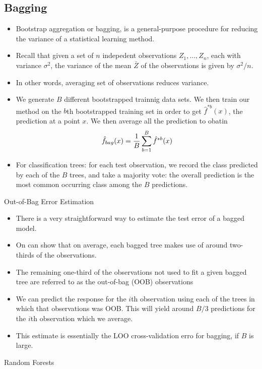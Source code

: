 \documentclass[11pt, a4paper]{article}
\begin{document}
\subsection{Bagging}
\begin{itemize}
  \item Bootstrap aggregation or bagging, is a general-purpose procedure for reducing the variance of a statistical learning method.
  \item Recall that given a set of $n$ indepedent observations $Z_1,\dots,Z_n$, each with variance $\sigma^2$, the variance of the mean $\bar{Z}$ of the observations is given by $\sigma^2/n$.
  \item In other words, averaging set of observations reduces variance.
  \item We generate $B$ different bootstrapped trainnig data sets. We then train our method on the $b$th bootstrapped training set in order to get $\hat{f}^{*b}(x)$, the prediction at a point $x$. We then average all the prediction to obatin
\[
  \hat{f}_{bag}(x)={1\over B}\sum_{b=1}^B\hat{f}^{*b}(x)
\]
\item For classification trees: for each test observation, we record the class predicted by each of the $B$ trees, and take a majority vote: the overall prediction is the most common occurring class among the $B$ predictions.
  \end{itemize}
Out-of-Bag Error Estimation
\begin{itemize}
  \item There is a very straightforward way to estimate the test error of a bagged model.
  \item On can show that on average, each bagged tree makes use of around two-thirds of the observations.
  \item The remaining one-third of the observations not used to fit a given bagged tree are referred to as the out-of-bag (OOB) observations
  \item We can predict the response for the $i$th observation using each of the trees in which that observations was OOB. This will yield around $B/3$ predictions for the $i$th observation which we average.
  \item This estimate is essentially the LOO cross-validation erro for bagging, if $B$ is large.
\end{itemize}
Random Forests
\end{document}
